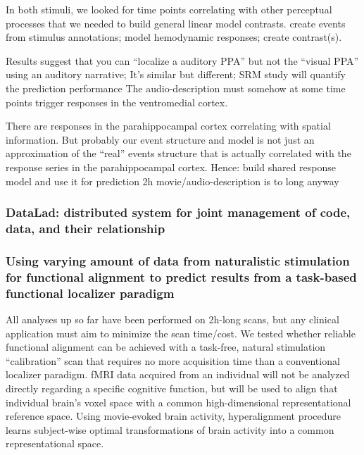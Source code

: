 %
In both stimuli, we looked for time points correlating with other perceptual
processes that we needed to build general linear model contrasts.
%
create events from stimulus annotations;
%
model hemodynamic responses;
%
create contrast(s).

%
Results suggest that you can ``localize a auditory PPA'' but not the ``visual
PPA'' using an auditory narrative; It's similar but different; SRM study will
quantify the prediction performance
%
The audio-description must somehow at some time points trigger responses in the
ventromedial cortex.

%
There are responses in the parahippocampal cortex correlating with
spatial information.
%
But probably our event structure and model is not just an approximation of the
``real'' events structure that is actually correlated with the response series
in the parahippocampal cortex.
%
Hence: build shared response model and use it for prediction
%
2h movie/audio-description is to long anyway


\subsubsection{DataLad: distributed system for joint management of code, data,
and their relationship}



\subsubsection{Using varying amount of data from naturalistic stimulation for
functional alignment to predict results from a task-based functional localizer
paradigm}


%
All analyses up so far have been performed on 2h-long scans, but any
clinical application must aim to minimize the scan time/cost.
%
We tested whether reliable functional alignment can be achieved with a task-free,
natural stimulation ``calibration'' scan that requires no more acquisition time
than a conventional localizer paradigm.
%
fMRI data acquired from an individual will not be analyzed directly regarding a
specific cognitive function, but will be used to align that individual brain's
voxel space with a common high-dimensional representational reference space.
%
Using movie-evoked brain activity, hyperalignment procedure learns subject-wise
optimal transformations of brain activity into a common representational space.

